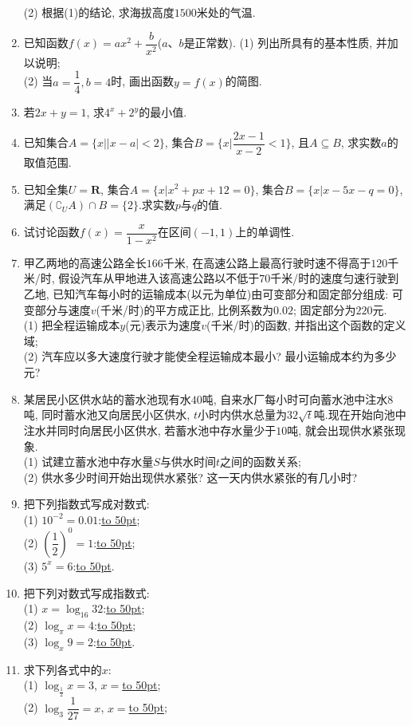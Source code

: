 \documentclass[10pt,a4paper]{article}
\newcommand{\blank}[1]{\underline{\hbox to #1pt{}}}
\begin{document}
\begin{enumerate}[1.]
(2) 根据(1)的结论, 求海拔高度$1500$米处的气温.
\item 已知函数$f(x)=ax^2+\dfrac b{x^2}$($a$、$b$是正常数).
(1) 列出所具有的基本性质, 并加以说明;\\
(2) 当$a=\dfrac 14,b=4$时, 画出函数$y=f(x)$的简图.
\item 若$2x+y=1$, 求$4^x+2^y$的最小值.
\item 已知集合$A=\{x||x-a|<2\}$, 集合$B=\{x|\dfrac{2x-1}{x-2}<1\}$, 且$A\subseteq B$, 求实数$a$的取值范围.
\item 已知全集$U=\mathbf{R}$, 集合$A=\{x|x^2+px+12=0\}$, 集合$B=\{x|x-5x-q=0\}$, 满足$(\complement _UA)\cap B=\{2\}$.求实数$p$与$q$的值.
\item 试讨论函数$f(x)=\dfrac x{1-x^2}$在区间$(-1,1)$上的单调性.
\item 甲乙两地的高速公路全长$166$千米, 在高速公路上最高行驶时速不得高于$120$千米/时, 假设汽车从甲地进入该高速公路以不低于$70$千米/时的速度匀速行驶到乙地, 已知汽车每小时的运输成本(以元为单位)由可变部分和固定部分组成: 可变部分与速度$v$(千米/时)的平方成正比, 比例系数为$0.02$; 固定部分为$220$元.\\
(1) 把全程运输成本$y$(元)表示为速度$v$(千米/时)的函数, 并指出这个函数的定义域;\\
(2) 汽车应以多大速度行驶才能使全程运输成本最小? 最小运输成本约为多少元?
\item 某居民小区供水站的蓄水池现有水$40$吨, 自来水厂每小时可向蓄水池中注水$8$吨, 同时蓄水池又向居民小区供水, $t$小时内供水总量为$32\sqrt t$吨.现在开始向池中注水并同时向居民小区供水, 若蓄水池中存水量少于$10$吨, 就会出现供水紧张现象.\\
(1) 试建立蓄水池中存水量$S$与供水时间$t$之间的函数关系;\\
(2) 供水多少时间开始出现供水紧张? 这一天内供水紧张的有几小时?
\item 把下列指数式写成对数式:\\
(1) $10^{-2}=0.01$:\blank{50};\\
(2) $(\dfrac 12)^0=1$:\blank{50};\\
(3) $5^x=6$:\blank{50}.
\item 把下列对数式写成指数式:\\
(1) $x=\log _{16}32$:\blank{50};\\
(2) $\log _{\pi }x=4$:\blank{50};\\
(3) $\log _x9=2$:\blank{50}.
\item 求下列各式中的$x$:\\
(1) $\log _{\frac 12}x=3$, $x=$\blank{50};\\
(2) $\log _3\dfrac 1{27}=x$, $x=$\blank{50};\\

\end{enumerate}
\end{document}
